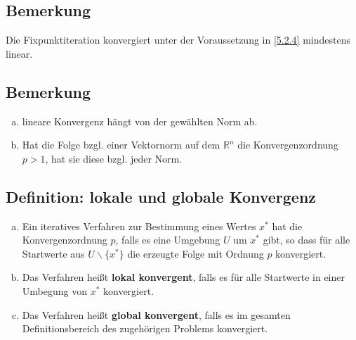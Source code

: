 \documentclass[ngerman,fontsize=11pt, paper=a4, parskip=half, titlepage=true, toc=bib]{scrbook}
\newcommand{\R}{\mathds{R}}
\begin{document}
  
  \subsection{Bemerkung}
  Die Fixpunktiteration konvergiert unter der Voraussetzung in \ref{5.2.4} mindestens linear.
  
  \subsection{Bemerkung}
  \begin{enumerate}[a)]
  \item  lineare Konvergenz hängt von der gewählten Norm ab.
  \item Hat die Folge bzgl. einer Vektornorm auf dem $\R^n$ die Konvergenzordnung $p>1$,
    hat sie diese bzgl. jeder Norm.
  \end{enumerate}
  
  \subsection{Definition: lokale und globale Konvergenz} \label{5.3.4}
  \begin{enumerate}[a)]
  \item Ein iteratives Verfahren zur Bestimmung eines Wertes $x^{*}$ hat 
    die Konvergenzordnung $p$, falls es eine Umgebung $U$ um $x^{*}$ gibt, 
    so dass für alle Startwerte aus $U\backslash \{x^{*}\}$ die erzeugte Folge mit Ordnung $p$ konvergiert.
  \item Das Verfahren heißt \textbf{lokal konvergent},
    falls es für alle Startwerte in einer Umbegung von $x^{*}$ konvergiert.
  \item Das Verfahren heißt \textbf{global konvergent},
    falls es im gesamten Definitionsbereich des zugehörigen Problems konvergiert.
  \end{enumerate}
  
  
\end{document}
